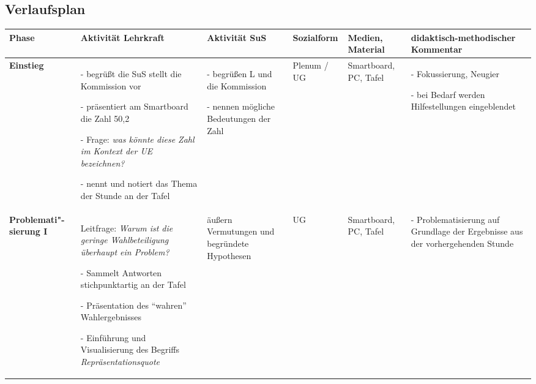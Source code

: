 

 \begin{landscape}
 \section{Verlaufsplan}

 \singlespacing
 \scriptsize
 \begin{tabular}{p{2cm}|p{4.5cm}|p{4.5cm}|p{1.5cm}|p{2cm}|p{4.5cm}}

\textbf{Phase} &
\textbf{Aktivität Lehrkraft} &
\textbf{Aktivität SuS} &
\textbf{Sozialform} &
\textbf{Medien, Material} &
\textbf{didaktisch-methodischer Kommentar}

\\
\hline
\textbf{Einstieg}
&
- begrüßt die SuS stellt die Kommission vor

- präsentiert am Smartboard die Zahl 50,2

- Frage: \emph{was könnte diese Zahl im Kontext der UE bezeichnen?}

- nennt und notiert das Thema der Stunde an der Tafel
&
- begrüßen L und die Kommission

- nennen mögliche Bedeutungen der Zahl
&
Plenum / UG
&
Smartboard, PC, Tafel
&
- Fokussierung, Neugier

- bei Bedarf werden Hilfestellungen eingeblendet

\begin{comment}
\begin{itemize*}
    \item bereitet vor und mit längerem text, aber das kostet zuviel platz

    \item kontrolliert
\end{itemize*}
\end{comment}

\\
\hline

\textbf{Problemati"-sierung I}
&
Leitfrage: \emph{Warum ist die geringe Wahlbeteiligung überhaupt ein Problem?}

- Sammelt Antworten stichpunktartig an der Tafel

- Präsentation des \enquote{wahren} Wahlergebnisses

- Einführung und Visualisierung des Begriffs \emph{Repräsentationsquote}
&
äußern Vermutungen und begründete Hypothesen
&
UG
&
Smartboard, PC, Tafel
&
- Problematisierung auf Grundlage der Ergebnisse aus der vorhergehenden Stunde


\end{tabular}
\end{landscape}
